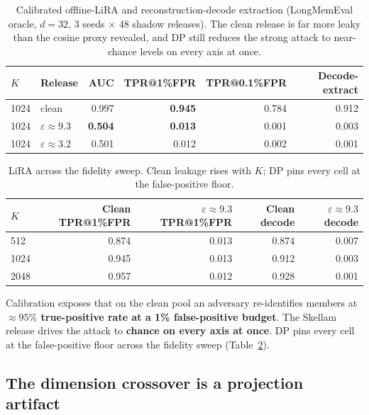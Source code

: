\documentclass[conference]{IEEEtran}
\theoremstyle{remark}
\newcommand{\eps}{\varepsilon}
\begin{document}
\begin{table}[t]
  \centering
  \caption{Calibrated offline-LiRA and reconstruction-decode extraction (LongMemEval oracle,
  $d = 32$, 3 seeds $\times$ 48 shadow releases). The clean release is far more leaky than the
  cosine proxy revealed, and DP still reduces the strong attack to near-chance levels on every axis at once.}
  \label{tab:lira}
  \begin{tabular}{@{}llrrrr@{}}
    \toprule
    $K$ & Release & AUC & TPR@1\%FPR & TPR@0.1\%FPR & Decode-extract \\
    \midrule
    1024 & clean               & 0.997          & \textbf{0.945} & 0.784 & 0.912 \\
    1024 & $\eps \approx 9.3$  & \textbf{0.504} & \textbf{0.013} & 0.001 & 0.003 \\
    1024 & $\eps \approx 3.2$  & 0.501          & 0.012          & 0.002 & 0.001 \\
    \bottomrule
  \end{tabular}
\end{table}
\begin{table}[t]
  \centering
  \caption{LiRA across the fidelity sweep. Clean leakage rises with $K$; DP pins every cell
  at the false-positive floor.}
  \label{tab:lira-sweep}
  \footnotesize
  \begin{tabular}{@{}lrrrr@{}}
    \toprule
    $K$ & Clean TPR@1\%FPR & $\eps \approx 9.3$ TPR@1\%FPR & Clean decode & $\eps \approx 9.3$ decode \\
    \midrule
    512  & 0.874 & 0.013 & 0.874 & 0.007 \\
    1024 & 0.945 & 0.013 & 0.912 & 0.003 \\
    2048 & 0.957 & 0.012 & 0.928 & 0.001 \\
    \bottomrule
  \end{tabular}
\end{table}

Calibration exposes that on the clean pool an adversary re-identifies members at \textbf{${\approx}95\%$ true-positive rate at a 1\% false-positive budget}. The Skellam release drives the attack to \textbf{chance on every axis at once}. DP pins every cell at the false-positive floor across the fidelity sweep (Table~\ref{tab:lira-sweep}).

\subsection{The dimension crossover is a projection artifact}\label{sec:crossover}
\end{document}
